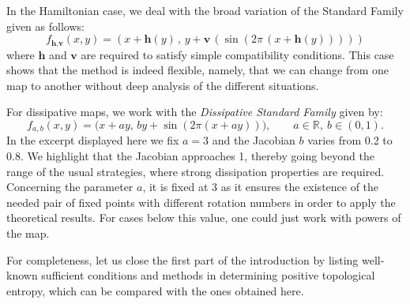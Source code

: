 \documentclass[12pt,a4paper]{amsart}
\theoremstyle{definition}
\theoremstyle{remark}
\newcommand{\R}{\mathbb{R}}
\begin{document}
In the Hamiltonian case, we deal with the broad variation of the Standard Family given as follows:
$$f_{\textbf{h},\textbf{v}}(x,y)=(x+\textbf{h}(y)\,,\,y+\textbf{v}\,(\sin(2\pi\,(x+\textbf{h}(y)))))$$
where $\textbf{h}$ and $\textbf{v}$ are required to satisfy simple compatibility conditions. This case shows that
the method is indeed flexible, namely, that we can change from one map to another without 
deep analysis of the different situations.

\smallskip


For dissipative maps, we work with the  \emph{Dissipative Standard Family} given by:
$$f_{a,b}(x,y)=\bigl(x+a y,\,b y+\sin(2\pi(x+a y))\bigr),
\qquad a\in\R,\ b\in(0,1).$$
In the excerpt displayed here we fix $a=3$ and the Jacobian $b$ varies from 0.2 to 0.8. We highlight that the Jacobian approaches 1, thereby going beyond the range of the usual strategies, where strong dissipation properties are required. 
Concerning the parameter $a$, it is fixed at 3 as it ensures the existence of the needed pair of fixed points with different rotation numbers in order to apply the theoretical results. For cases below this value, one could just work with powers of the map.

\smallskip

For completeness, let us close the first part of the introduction by listing well-known sufficient conditions and methods in determining positive topological entropy, which can be compared with the ones obtained here.
\end{document}
